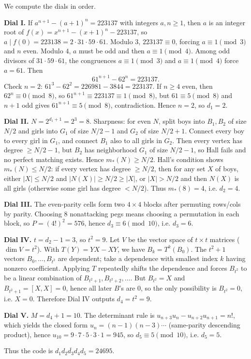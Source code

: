 \medskip
{}

\SolutionPage
We compute the dials in order.

\smallskip
\textbf{Dial I.} If \(a^{n+1}-(a+1)^n=223137\) with integers \(a,n\ge1\), then \(a\) is an integer root of
\(f(x)=x^{n+1}-(x+1)^n-223137\), so \(a\mid f(0)=223138=2\cdot31\cdot59\cdot61\).
Modulo \(3\), \(223137\equiv0\), forcing \(a\equiv1\pmod3\) and \(n\) even.
Modulo \(4\), \(a\) must be odd and then \(a\equiv1\pmod4\).
Among odd divisors of \(31\cdot59\cdot61\), the congruences \(a\equiv1\pmod3\) and \(a\equiv1\pmod4\) force \(a=61\).
Then
\[
61^{n+1}-62^n=223137.
\]
Check \(n=2\): \(61^3-62^2=226981-3844=223137\).
If \(n\ge4\) even, then \(62^n\equiv0\pmod8\), so \(61^{n+1}\equiv223137\equiv1\pmod8\), but \(61\equiv5\pmod8\) and \(n+1\) odd gives \(61^{n+1}\equiv5\pmod8\), contradiction.
Hence \(n=2\), so \(d_1=2\).

\smallskip
\textbf{Dial II.} \(N=2^{d_1+1}=2^3=8\).
Sharpness: for even \(N\), split boys into \(B_1,B_2\) of size \(N/2\) and girls into \(G_1\) of size \(N/2-1\) and \(G_2\) of size \(N/2+1\). Connect every boy to every girl in \(G_1\), and connect \(B_1\) also to all girls in \(G_2\). Then every vertex has degree \(\ge N/2-1\), but \(B_2\) has neighborhood \(G_1\) of size \(N/2-1\), so Hall fails and no perfect matching exists. Hence \(m_\ast(N)\ge N/2\). Hall’s condition shows \(m_\ast(N)\le N/2\): if every vertex has degree \(\ge N/2\), then for any set \(X\) of boys, either \(|X|\le N/2\) and \(|N(X)|\ge N/2\ge|X|\), or \(|X|>N/2\) and then \(N(X)\) is all girls (otherwise some girl has degree \(<N/2\)). Thus \(m_\ast(8)=4\), i.e. \(d_2=4\).

\smallskip
\textbf{Dial III.} The even-parity cells form two \(4\times4\) blocks after permuting rows/cols by parity.
Choosing \(8\) nonattacking pegs means choosing a permutation in each block, so
\(P=(4!)^2=576\), hence \(d_3\equiv 6\pmod{10}\), i.e. \(d_3=6\).

\smallskip
\textbf{Dial IV.} \(t=d_2-1=3\), so \(t^2=9\).
Let \(V\) be the vector space of \(t\times t\) matrices (\(\dim V=t^2\)).
With \(T(Y)=YX-XY\), we have \(B_{k}=T^k(B_0)\).
The \(t^2+1\) vectors \(B_0,\dots,B_{t^2}\) are dependent; take a dependence with smallest index \(k\) having nonzero coefficient.
Applying \(T\) repeatedly shifts the dependence and forces \(B_{t^2}\) to be a linear combination of \(B_{t^2+1},B_{t^2+2},\dots\).
But \(B_{t^2}=X\) and \(B_{t^2+1}=[X,X]=0\), hence all later \(B\)’s are \(0\), so the only possibility is \(B_{t^2}=0\), i.e. \(X=0\).
Therefore Dial IV outputs \(d_4=t^2=9\).

\smallskip
\textbf{Dial V.} \(M=d_4+1=10\).
The determinant rule is \(u_{n+3}u_n-u_{n+2}u_{n+1}=n!\), which yields the closed form
\(u_n=(n-1)(n-3)\cdots\) (same-parity descending product), hence
\(u_{10}=9\cdot7\cdot5\cdot3\cdot1=945\), so \(d_5\equiv5\pmod{10}\), i.e. \(d_5=5\).

Thus the code is \(\overline{d_1d_2d_3d_4d_5}=24695\).


\NextPage
